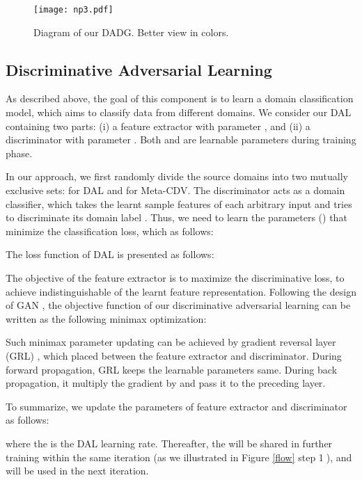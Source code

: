 \documentclass[twocolumn,preprint]{elsarticle}
\begin{document}
\begin{figure}[t]
  \centering
  \texttt{[image: np3.pdf]}
  \caption{Diagram of our DADG. Better view in colors.}

  \label{3dupdate}
\end{figure}

\subsection{Discriminative Adversarial Learning} \label{DAL}
As described above, the goal of this component is to learn a domain classification model, which aims to classify data from different domains. We consider our DAL containing two parts: (i) a feature extractor \textit{} with parameter \textit{}, and (ii) a discriminator \textit{} with parameter . Both  and  are learnable parameters during training phase.

In our approach, we first randomly divide the source domains  into two mutually exclusive sets: 
 for DAL and  for Meta-CDV.
The discriminator acts as a domain classifier, which takes the learnt sample features  of each arbitrary input  and tries to discriminate its domain label . Thus, we need to learn the parameters () that minimize the classification loss, which as follows:




The loss function of DAL is presented as follows:



The objective of the feature extractor is to maximize the discriminative loss, to achieve indistinguishable of the learnt feature representation. 
Following the design of GAN \cite{gan}, the objective function of our discriminative adversarial learning can be written as the following minimax optimization:


Such minimax parameter updating can be achieved by gradient reversal layer (GRL) \cite{unsupervised-DA}, which placed between the feature extractor and discriminator. During forward propagation, GRL keeps the learnable parameters same. During back propagation, it multiply the gradient by  and pass it to the preceding layer. 

To summarize, we update the parameters of feature extractor and discriminator as follows:


where the  is the DAL learning rate. Thereafter, the  will be shared in further training within the same iteration (as we illustrated in Figure \ref{flow} step \textcircled{1}), and  will be used in the next iteration.
\end{document}
